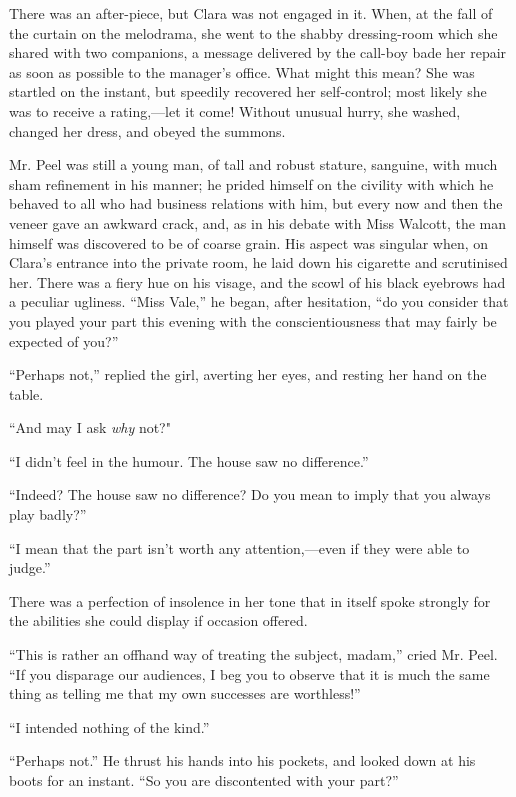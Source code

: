 There was an after-piece, but Clara was not engaged in it. When, at the
fall of the curtain on the melodrama, she went to the shabby
dressing-room which she shared with two companions, a message delivered
by the call-boy bade her repair as soon as possible to the manager's
office. What might this mean? She was startled on the instant, but
speedily recovered her self-control; most likely she was to receive a
rating,---let it come! Without unusual hurry, she washed, changed her
dress, and obeyed the summons.

Mr. Peel was still a young man, of tall and robust stature, sanguine,
with much sham refinement in his manner; he prided himself on {}the
civility with which he behaved to all who had business relations with
him, but every now and then the veneer gave an awkward crack, and, as in
his debate with Miss Walcott, the man himself was discovered to be of
coarse grain. His aspect was singular when, on Clara's entrance into the
private room, he laid down his cigarette and scrutinised her. There was
a fiery hue on his visage, and the scowl of his black eyebrows had a
peculiar ugliness. ``Miss Vale,'' he began, after hesitation, ``do you
consider that you played your part this evening with the
conscientiousness that may fairly be expected of you?''

``Perhaps not,'' replied the girl, averting her eyes, and resting her
hand on the table.

``And may I ask \emph{why} not?"

``I didn't feel in the humour. The house saw no difference.''

``Indeed? The house saw no difference? Do you mean to imply that you
always play badly?''

``I mean that the part isn't worth any attention,---even if they were
able to judge.''

{}There was a perfection of insolence in her tone that in itself spoke
strongly for the abilities she could display if occasion offered.

``This is rather an offhand way of treating the subject, madam,'' cried
Mr. Peel. ``If you disparage our audiences, I beg you to observe that it
is much the same thing as telling me that my own successes are
worthless!''

``I intended nothing of the kind.''

``Perhaps not.'' He thrust his hands into his pockets, and looked down
at his boots for an instant. ``So you are discontented with your part?''

